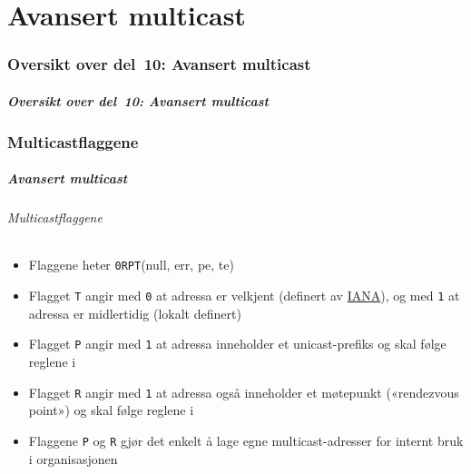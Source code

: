 \part{Avansert multicast}

\begin{frame}
  \partpage
\end{frame}

\section*{Oversikt over del~10: Avansert multicast}
\begin{frame}[allowframebreaks]
  \frametitle{Oversikt over del~10: Avansert multicast}
    \tableofcontents%
\end{frame}

\section{Multicastflaggene}
\begin{frame}%
  \frametitle{Avansert multicast}
  \framesubtitle{Multicastflaggene}
  \pause
  \begin{itemize}[<+->]
  \item Flaggene heter \texttt{0RPT}\hfill(null, err, pe, te)
  \item Flagget \texttt{T} angir med \texttt{0} at adressa er velkjent
    (definert av \href{http://www.iana.org/}{IANA}), og med \texttt{1}
    at adressa er midlertidig (lokalt definert)
  \item Flagget \texttt{P} angir med \texttt{1} at adressa inneholder
    et unicast-prefiks og skal følge reglene i 
  \item Flagget \texttt{R} angir med \texttt{1} at adressa også
    inneholder et møtepunkt («rendezvous point») og skal følge reglene
    i 
  \item Flaggene \texttt{P} og \texttt{R} gjør det enkelt å lage egne
    multicast-adresser for internt bruk i organisasjonen
  \end{itemize}
\end{frame}

